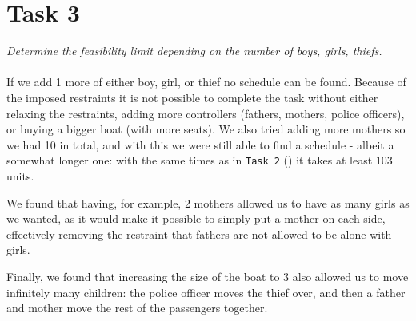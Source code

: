 \section{Task 3}
\label{sec:task3}
\textit{Determine the feasibility limit depending on the number of boys, girls, thiefs.}\\\\
If we add 1 more of either boy, girl, or thief no schedule can be found. Because of the imposed restraints it is not possible to complete the task without either relaxing the restraints, adding more controllers (fathers, mothers, police officers), or buying a bigger boat (with more seats). We also tried adding more mothers so we had 10 in total, and with this we were still able to find a schedule - albeit a somewhat longer one: with the same times as in \texttt{Task 2} () it takes at least 103 units.

We found that having, for example, 2 mothers allowed us to have as many girls as we wanted, as it would make it possible to simply put a mother on each side, effectively removing the restraint that fathers are not allowed to be alone with girls.

Finally, we found that increasing the size of the boat to 3 also allowed us to move infinitely many children: the police officer moves the thief over, and then a father and mother move the rest of the passengers together.
